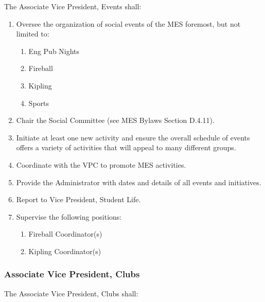 The Associate Vice President, Events shall:

\begin{enumerate}
 \item
  Oversee the organization of social events of the MES foremost, but not
  limited to:

  \begin{enumerate}
   \item
    Eng Pub Nights
   \item
    Fireball
   \item
    Kipling
   \item
    Sports
  \end{enumerate}
 \item
  Chair the Social Committee (see MES Bylaws Section D.4.11).
 \item
  Initiate at least one new activity and ensure the overall schedule of
  events offers a variety of activities that will appeal to many
  different groups.
 \item
  Coordinate with the VPC to promote MES activities.
 \item
  Provide the Administrator with dates and details of all events and
  initiatives.
 \item
  Report to Vice President, Student Life.
 \item
  Supervise the following positions:

  \begin{enumerate}
   \item
    Fireball Coordinator(s)
   \item
    Kipling Coordinator(s)

  \end{enumerate}
\end{enumerate}

\hypertarget{associate-vice-president-clubs}{%
 \subsubsection{Associate Vice President,
  Clubs}
 \label{associate-vice-president-clubs}}
The Associate Vice President, Clubs shall:

